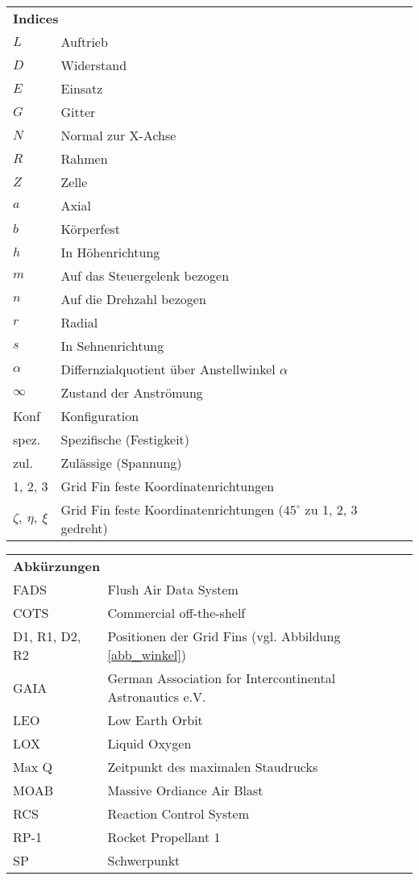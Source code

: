 \begin{longtable}[l]{ll}
	\multicolumn{2}{l}{\textbf{Indices}}\\
	$L$&Auftrieb\\
	$D$&Widerstand\\
	$E$&Einsatz\\
	$G$&Gitter\\
	$N$&Normal zur X-Achse\\
	$R$&Rahmen\\
	$Z$&Zelle\\
	$a$&Axial\\
	$b$&Körperfest\\
	$h$&In Höhenrichtung\\
	$m$&Auf das Steuergelenk bezogen\\
	$n$&Auf die Drehzahl bezogen\\
	$r$&Radial\\
	$s$&In Sehnenrichtung\\
	$\alpha$&Differnzialquotient über Anstellwinkel $\alpha$\\
	$\infty$&Zustand der Anströmung\\
	Konf&Konfiguration\\
	spez.&Spezifische (Festigkeit)\\
	zul.&Zulässige (Spannung)\\
	1, 2, 3&Grid Fin feste Koordinatenrichtungen\\
	$\zeta ,\ \eta ,\ \xi$&Grid Fin feste Koordinatenrichtungen ($45^\circ$ zu 1, 2, 3 gedreht)\\
\end{longtable}

\begin{longtable}[l]{ll}
	\multicolumn{2}{l}{\textbf{Abkürzungen}}\\
	FADS&Flush Air Data System\\
	COTS&Commercial off-the-shelf\\
	D1, R1, D2, R2&Positionen der Grid Fins (vgl. Abbildung \ref{abb_winkel})\\
	GAIA&German Association for Intercontinental Astronautics e.V.\\
	LEO&Low Earth Orbit\\
	LOX&Liquid Oxygen\\
	Max Q&Zeitpunkt des maximalen Staudrucks\\
	MOAB&Massive Ordiance Air Blast\\
	RCS&Reaction Control System\\
	RP-1&Rocket Propellant 1\\
	SP&Schwerpunkt\\
\end{longtable}
